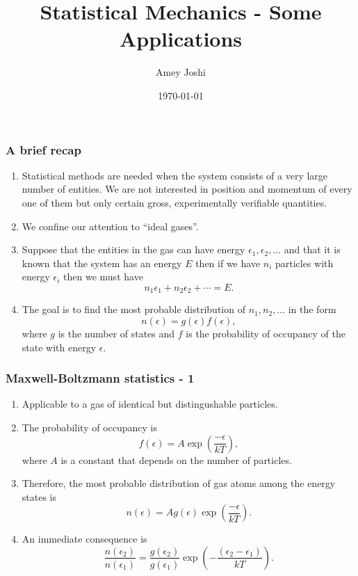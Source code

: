 \documentclass{beamer}
\title{Statistical Mechanics - Some Applications}
\author{Amey Joshi}
\date{\today}
\begin{document}
\begin{frame}
\titlepage
\end{frame}

\begin{frame}
\frametitle{A brief recap}
\begin{enumerate}
\item Statistical methods are needed when the system consists of a very large
number of entities. We are not interested in position and momentum of every one
of them but only certain gross, experimentally verifiable quantities.
\item We confine our attention to ``ideal gases''.
\item Suppose that the entities in the gas can have energy $\epsilon_1, 
\epsilon_2, \ldots$ and that it is known that the system has an energy $E$ then
if we have $n_i$ particles with energy $\epsilon_i$ then we must have
\begin{equation}\label{e1}
n_1\epsilon_1 + n_2\epsilon_2 + \cdots = E.
\end{equation}
\item The goal is to find the most probable distribution of $n_1, n_2, \ldots$
in the form
\begin{equation}\label{e2}
n(\epsilon) = g(\epsilon)f(\epsilon),
\end{equation}
where $g$ is the number of states and $f$ is the probability of occupancy of the
state with energy $\epsilon$.
\end{enumerate}
\end{frame}

\begin{frame}
\frametitle{Maxwell-Boltzmann statistics - 1}
\begin{enumerate}
\item Applicable to a gas of identical but distingushable particles.
\item The probability of occupancy is
\begin{equation}\label{e3}
f(\epsilon) = A\exp\left(\frac{-\epsilon}{kT}\right),
\end{equation}
where $A$ is a constant that depends on the number of particles.
\item Therefore, the most probable distribution of gas atoms among the energy 
states is
\begin{equation}\label{e4}
n(\epsilon) = Ag(\epsilon)\exp\left(\frac{-\epsilon}{kT}\right).
\end{equation}
\item An immediate consequence is
\begin{equation}\label{e5}
\frac{n(\epsilon_2)}{n(\epsilon_1)} = \frac{g(\epsilon_2)}{g(\epsilon_1)}
\exp\left(-\frac{(\epsilon_2 - \epsilon_1)}{kT}\right).
\end{equation}
\end{enumerate}
\end{frame}
\end{document}
